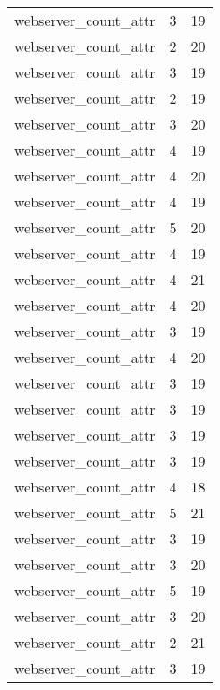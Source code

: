 \begin{table}
\begin{tabular}{lrr}
            webserver\_count\_attr &         3 &        19 \\
            webserver\_count\_attr &         2 &        20 \\
            webserver\_count\_attr &         3 &        19 \\
            webserver\_count\_attr &         2 &        19 \\
            webserver\_count\_attr &         3 &        20 \\
            webserver\_count\_attr &         4 &        19 \\
            webserver\_count\_attr &         4 &        20 \\
            webserver\_count\_attr &         4 &        19 \\
            webserver\_count\_attr &         5 &        20 \\
            webserver\_count\_attr &         4 &        19 \\
            webserver\_count\_attr &         4 &        21 \\
            webserver\_count\_attr &         4 &        20 \\
            webserver\_count\_attr &         3 &        19 \\
            webserver\_count\_attr &         4 &        20 \\
            webserver\_count\_attr &         3 &        19 \\
            webserver\_count\_attr &         3 &        19 \\
            webserver\_count\_attr &         3 &        19 \\
            webserver\_count\_attr &         3 &        19 \\
            webserver\_count\_attr &         4 &        18 \\
            webserver\_count\_attr &         5 &        21 \\
            webserver\_count\_attr &         3 &        19 \\
            webserver\_count\_attr &         3 &        20 \\
            webserver\_count\_attr &         5 &        19 \\
            webserver\_count\_attr &         3 &        20 \\
            webserver\_count\_attr &         2 &        21 \\
            webserver\_count\_attr &         3 &        19 \\

\end{tabular}
\end{table}

